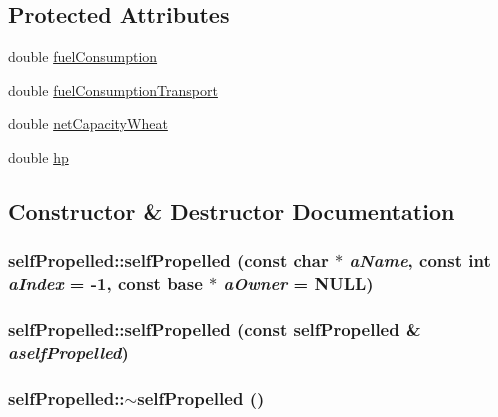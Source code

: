 \subsection*{Protected Attributes}
\begin{DoxyCompactItemize}
\item 
double \hyperlink{classself_propelled_ab2bd8685f92cad33b3a6c843fbacfbab}{fuelConsumption}
\item 
double \hyperlink{classself_propelled_a1e3f848c150f5969e36345d61ca5acfe}{fuelConsumptionTransport}
\item 
double \hyperlink{classself_propelled_a162544cbfaae0d03a62e7412eb5fd602}{netCapacityWheat}
\item 
double \hyperlink{classself_propelled_a946a2297532c377175592ef3ffc57b59}{hp}
\end{DoxyCompactItemize}


\subsection{Constructor \& Destructor Documentation}
\hypertarget{classself_propelled_a3220b264471ecf881c44bdcf974a149a}{
\subsubsection[{selfPropelled}]{\setlength{\rightskip}{0pt plus 5cm}selfPropelled::selfPropelled (const char $\ast$ {\em aName}, \/  const int {\em aIndex} = {\ttfamily -\/1}, \/  const {\bf base} $\ast$ {\em aOwner} = {\ttfamily NULL})}}
\label{classself_propelled_a3220b264471ecf881c44bdcf974a149a}
\hypertarget{classself_propelled_a4f1cb9f067cf45aa1b966fd70be35667}{
\subsubsection[{selfPropelled}]{\setlength{\rightskip}{0pt plus 5cm}selfPropelled::selfPropelled (const {\bf selfPropelled} \& {\em aselfPropelled})}}
\label{classself_propelled_a4f1cb9f067cf45aa1b966fd70be35667}
\hypertarget{classself_propelled_a2092fb2d3a8fe34c6b3c90c5653723f7}{
\subsubsection[{$\sim$selfPropelled}]{\setlength{\rightskip}{0pt plus 5cm}selfPropelled::$\sim$selfPropelled ()}}
\label{classself_propelled_a2092fb2d3a8fe34c6b3c90c5653723f7}


